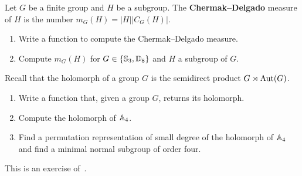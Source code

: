 

\begin{prob}
	\label{prob:ChermakDelgado}
	Let $G$ be a finite group and $H$ be a subgroup. The \textbf{Chermak--Delgado} measure of $H$ 
	is the number $m_G(H)=|H||C_G(H)|$. 
	\begin{enumerate}[label=(\alph*)]
	\item Write a function to compute the Chermak--Delgado measure.
	\item Compute $m_G(H)$ for $G\in\{\mathbb{S}_3,\mathbb{D}_8\}$ and $H$ a subgroup of $G$. 
\end{enumerate}
\end{prob}

\begin{prob}
	\label{prob:holA4}
Recall that the holomorph of a group $G$ is the semidirect product $G\rtimes \operatorname{Aut}(G)$.
\begin{enumerate}
\item Write a function that, given a group $G$, returns its holomorph.
\item Compute the holomorph of $\mathbb{A}_4$. 
\item Find a permutation representation 
of small degree of the holomorph of $\mathbb{A}_4$ and find a minimal normal subgroup of order four. 
\end{enumerate}
This is an exercise of~\cite{MR2478410}.
\end{prob}


